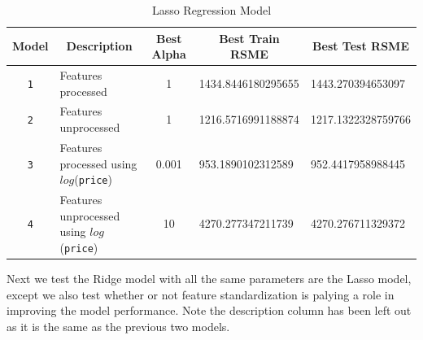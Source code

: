 \documentclass[11pt,letterpaper]{article}
\begin{document}
\begin{table}[H]
    \centering
    \begin{tabular}{clcll}
        \hline
    Model & \multicolumn{1}{c}{Description} & \multicolumn{1}{c}{Best Alpha} & \multicolumn{1}{c}{Best Train RSME} & \multicolumn{1}{c}{Best Test RSME} \\
    \hline
    \texttt{1}     & Features processed       & 1       & 1434.8446180295655                                                     & 1443.270394653097                                                      \\
    \texttt{2}     & Features unprocessed    & 1        & 1216.5716991188874                                                      & 1217.1322328759766
    \\
    \texttt{3}     & Features processed using $log$(\texttt{price})  & 0.001 & 953.1890102312589                                                     & 952.4417958988445                                                       \\
    \texttt{4}     & Features unprocessed using $log$(\texttt{price}) & 10 &  4270.277347211739                                                   & 4270.276711329372                                                   
    \end{tabular}
    \caption{Lasso Regression Model}
\end{table}


Next we test the Ridge model with all the same parameters are the Lasso model, except
we also test whether or not feature standardization is palying a role in improving 
the model performance. Note the description column has been left out as it is the same as the previous 
two models.
\end{document}

